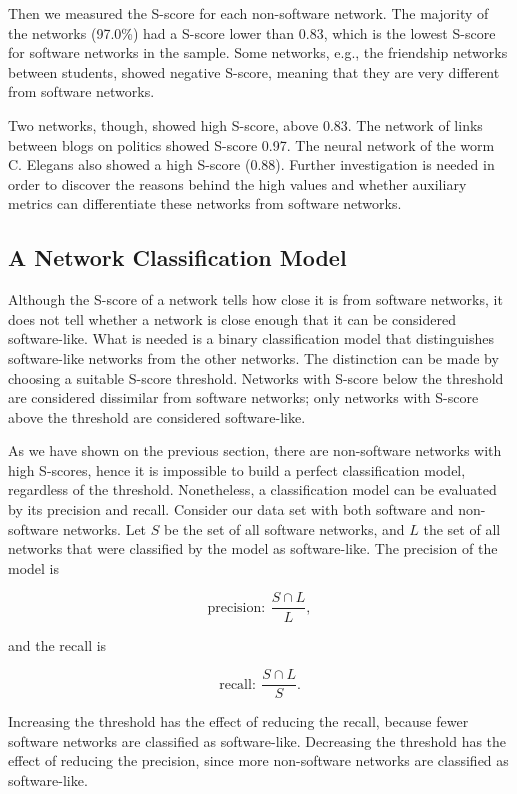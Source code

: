 
Then we measured the S-score for each non-software network. The majority of the
networks (97.0\%) had a S-score lower than 0.83, which is the lowest S-score for
software networks in the sample. Some networks, e.g., the friendship networks
between students, showed negative S-score, meaning that they are very different
from software networks.

Two networks, though, showed high S-score, above 0.83. The network of links
between blogs on politics showed S-score 0.97. The neural network of the worm C.
Elegans also showed a high S-score (0.88). Further investigation is needed in
order to discover the reasons behind the high values and whether auxiliary
metrics can differentiate these networks from software networks.

\subsection{A Network Classification Model} \label{sec:classmodel}

Although the S-score of a network tells how close it is from software networks,
it does not tell whether a network is close enough that it can be considered
software-like. What is needed is a binary classification model that
distinguishes software-like networks from the other networks. The distinction
can be made by choosing a suitable S-score threshold. Networks with S-score
below the threshold are considered dissimilar from software networks; only
networks with S-score above the threshold are considered software-like. 

As we have shown on the previous section, there are non-software networks with
high S-scores, hence it is impossible to build a perfect classification model,
regardless of the threshold. Nonetheless, a classification model can be
evaluated by its precision and recall. Consider our data set with both software
and non-software networks. Let $S$ be the set of all software networks, and $L$
the set of all networks that were classified by the model as software-like. The
precision of the model is

$$
\mathrm{precision}: ~\frac{S \cap L}{L},
$$

and the recall is

$$
\mathrm{recall}: ~\frac{S \cap L}{S}.
$$

Increasing the threshold has the effect of reducing the recall, because fewer
software networks are classified as software-like. Decreasing the threshold has
the effect of reducing the precision, since more non-software networks are
classified as software-like. 


